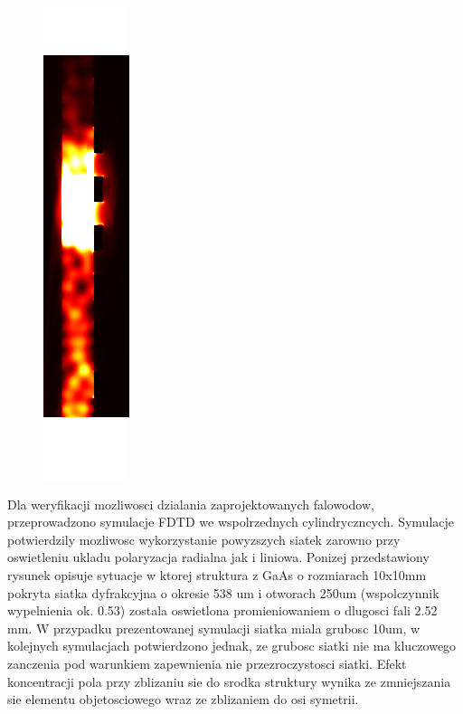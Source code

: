 \begin{figure}
\includegraphics{images/antenaThz/ro_consrc_radial_antena.png}
\end{figure}

Dla weryfikacji mozliwosci dzialania zaprojektowanych falowodow, przeprowadzono symulacje FDTD we wspolrzednych cylindryczncych. Symulacje potwierdzily mozliwosc wykorzystanie powyzszych siatek zarowno przy oswietleniu ukladu polaryzacja radialna jak  i liniowa. Ponizej przedstawiony rysunek opisuje sytuacje w ktorej struktura z GaAs o rozmiarach 10x10mm pokryta siatka dyfrakcyjna o okresie 538 um i otworach 250um (wspolczynnik wypelnienia ok. 0.53) zostala oswietlona promieniowaniem o dlugosci fali 2.52 mm. W przypadku prezentowanej symulacji siatka miala grubosc 10um, w kolejnych symulacjach potwierdzono jednak, ze grubosc siatki nie ma kluczowego zanczenia pod warunkiem zapewnienia nie przezroczystosci siatki. Efekt koncentracji pola przy zblizaniu sie do srodka struktury wynika ze zmniejszania sie elementu objetosciowego wraz ze zblizaniem do osi symetrii. 



